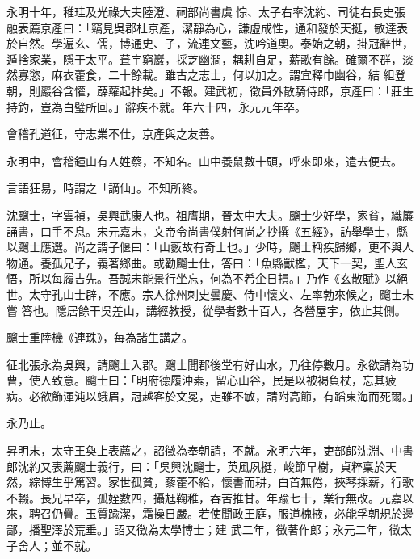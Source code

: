 \begin{pinyinscope}
 永明十年，稚珪及光祿大夫陸澄、祠部尚書虞悰、太子右率沈約、司徒右長史張融表薦京產曰：「竊見吳郡杜京產，潔靜為心，謙虛成性，通和發於天挺，敏達表於自然。學遍玄、儒，博通史、子，流連文藝，沈吟道奧。泰始之朝，掛冠辭世，遁捨家業，隱于太平。葺宇窮巖，採芝幽澗，耦耕自足，薪歌有餘。確爾不群，淡然寡慾，麻衣藿食，二十餘載。雖古之志士，何以加之。謂宜釋巾幽谷，結
 組登朝，則巖谷含懽，薜蘿起抃矣。」不報。建武初，徵員外散騎侍郎，京產曰：「莊生持釣，豈為白璧所回。」辭疾不就。年六十四，永元元年卒。



 會稽孔道征，守志業不仕，京產與之友善。



 永明中，會稽鐘山有人姓蔡，不知名。山中養鼠數十頭，呼來即來，遣去便去。



 言語狂易，時謂之「謫仙」。不知所終。



 沈飀士，字雲禎，吳興武康人也。祖膺期，晉太中大夫。飀士少好學，家貧，織簾誦書，口手不息。宋元嘉末，文帝令尚書僕射何尚之抄撰《五經》，訪舉學士，縣以飀士應選。尚之謂子偃曰：「山藪故有奇士也。」少時，飀士稱疾歸鄉，更不與人物通。養孤兄子，義著鄉曲。或勸飀士仕，答曰：「魚縣獸檻，天下一契，聖人玄悟，所以每履吉先。吾誠未能景行坐忘，何為不希企日損。」乃作《玄散賦》以絕世。太守孔山士辟，不應。宗人徐州刺史曇慶、侍中懷文、左率勃來候之，飀士未嘗
 答也。隱居餘干吳差山，講經教授，從學者數十百人，各營屋宇，依止其側。



 飀士重陸機《連珠》，每為諸生講之。



 征北張永為吳興，請飀士入郡。飀士聞郡後堂有好山水，乃往停數月。永欲請為功曹，使人致意。飀士曰：「明府德履沖素，留心山谷，民是以被褐負杖，忘其疲病。必欲飾渾沌以蛾眉，冠越客於文冕，走雖不敏，請附高節，有蹈東海而死爾。」



 永乃止。



 昇明末，太守王奐上表薦之，詔徵為奉朝請，不就。永明六年，吏部郎沈淵、中書郎沈約又表薦飀士義行，曰：「吳興沈飀士，英風夙挺，峻節早樹，貞粹稟於天然，綜博生乎篤習。家世孤貧，藜藿不給，懷書而耕，白首無倦，挾琴採薪，行歌不輟。長兄早卒，孤姪數四，攝尪鞠稚，吞苦推甘。年踰七十，業行無改。元嘉以來，聘召仍疊。玉質踰潔，霜操日嚴。若使聞政王庭，服道槐掖，必能孚朝規於邊鄙，播聖澤於荒垂。」詔又徵為太學博士；建
 武二年，徵著作郎；永元二年，徵太子舍人；並不就。




\end{pinyinscope}
